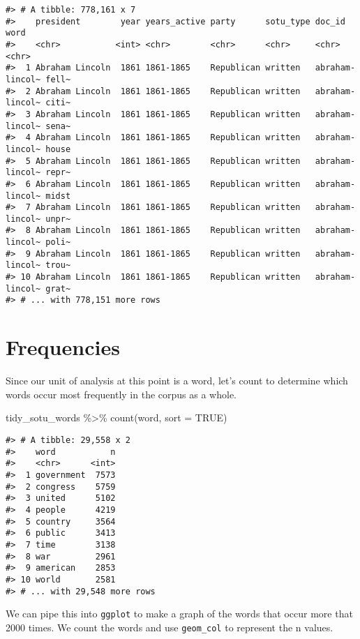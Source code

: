 \documentclass[
]{book}
\newenvironment{Shaded}{\begin{snugshade}}{\end{snugshade}}
\newcommand{\AttributeTok}[1]{\textcolor[rgb]{0.77,0.63,0.00}{#1}}
\newcommand{\ConstantTok}[1]{\textcolor[rgb]{0.00,0.00,0.00}{#1}}
\newcommand{\FunctionTok}[1]{\textcolor[rgb]{0.00,0.00,0.00}{#1}}
\newcommand{\NormalTok}[1]{#1}
\newcommand{\SpecialCharTok}[1]{\textcolor[rgb]{0.00,0.00,0.00}{#1}}
\begin{document}
\begin{verbatim}
#> # A tibble: 778,161 x 7
#>    president        year years_active party      sotu_type doc_id          word 
#>    <chr>           <int> <chr>        <chr>      <chr>     <chr>           <chr>
#>  1 Abraham Lincoln  1861 1861-1865    Republican written   abraham-lincol~ fell~
#>  2 Abraham Lincoln  1861 1861-1865    Republican written   abraham-lincol~ citi~
#>  3 Abraham Lincoln  1861 1861-1865    Republican written   abraham-lincol~ sena~
#>  4 Abraham Lincoln  1861 1861-1865    Republican written   abraham-lincol~ house
#>  5 Abraham Lincoln  1861 1861-1865    Republican written   abraham-lincol~ repr~
#>  6 Abraham Lincoln  1861 1861-1865    Republican written   abraham-lincol~ midst
#>  7 Abraham Lincoln  1861 1861-1865    Republican written   abraham-lincol~ unpr~
#>  8 Abraham Lincoln  1861 1861-1865    Republican written   abraham-lincol~ poli~
#>  9 Abraham Lincoln  1861 1861-1865    Republican written   abraham-lincol~ trou~
#> 10 Abraham Lincoln  1861 1861-1865    Republican written   abraham-lincol~ grat~
#> # ... with 778,151 more rows
\end{verbatim}

\hypertarget{frequencies}{%
\section{Frequencies}\label{frequencies}}

Since our unit of analysis at this point is a word, let's count to determine which words occur most frequently in the corpus as a whole.

\begin{Shaded}
\begin{Highlighting}[]
\NormalTok{tidy\_sotu\_words }\SpecialCharTok{\%\textgreater{}\%}
  \FunctionTok{count}\NormalTok{(word, }\AttributeTok{sort =} \ConstantTok{TRUE}\NormalTok{)}
\end{Highlighting}
\end{Shaded}

\begin{verbatim}
#> # A tibble: 29,558 x 2
#>    word           n
#>    <chr>      <int>
#>  1 government  7573
#>  2 congress    5759
#>  3 united      5102
#>  4 people      4219
#>  5 country     3564
#>  6 public      3413
#>  7 time        3138
#>  8 war         2961
#>  9 american    2853
#> 10 world       2581
#> # ... with 29,548 more rows
\end{verbatim}

We can pipe this into \texttt{ggplot} to make a graph of the words that occur more that 2000 times. We count the words and use \texttt{geom\_col} to represent the n values.
\end{document}
